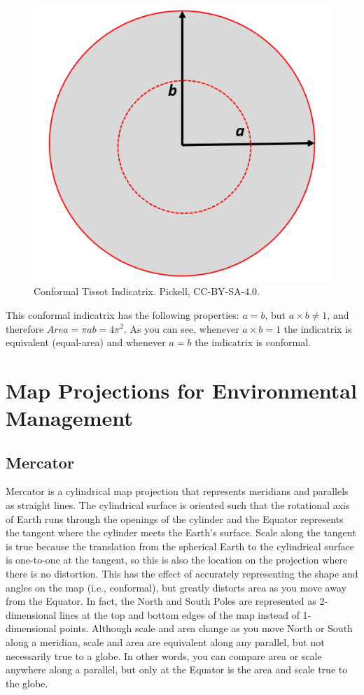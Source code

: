 \documentclass[
]{book}
\begin{document}
\begin{figure}
\includegraphics[width=0.75\linewidth]{images/02-conformal-indicatrix} \caption{Conformal Tissot Indicatrix. Pickell, CC-BY-SA-4.0.}\label{fig:2-conformal-indicatrix}
\end{figure}

This conformal indicatrix has the following properties: \(a=b\), but \(a×b≠1\), and therefore \(Area=πab=4π^2\). As you can see, whenever \(a×b=1\) the indicatrix is equivalent (equal-area) and whenever \(a=b\) the indicatrix is conformal.

\hypertarget{map-projections-for-environmental-management}{%
\section{Map Projections for Environmental Management}\label{map-projections-for-environmental-management}}

\hypertarget{mercator}{%
\subsection{Mercator}\label{mercator}}

Mercator is a cylindrical map projection that represents meridians and parallels as straight lines. The cylindrical surface is oriented such that the rotational axis of Earth runs through the openings of the cylinder and the Equator represents the tangent where the cylinder meets the Earth's surface. Scale along the tangent is true because the translation from the spherical Earth to the cylindrical surface is one-to-one at the tangent, so this is also the location on the projection where there is no distortion. This has the effect of accurately representing the shape and angles on the map (i.e., conformal), but greatly distorts area as you move away from the Equator. In fact, the North and South Poles are represented as 2-dimensional lines at the top and bottom edges of the map instead of 1-dimensional points. Although scale and area change as you move North or South along a meridian, scale and area are equivalent along any parallel, but not necessarily true to a globe. In other words, you can compare area or scale anywhere along a parallel, but only at the Equator is the area and scale true to the globe.
\end{document}

